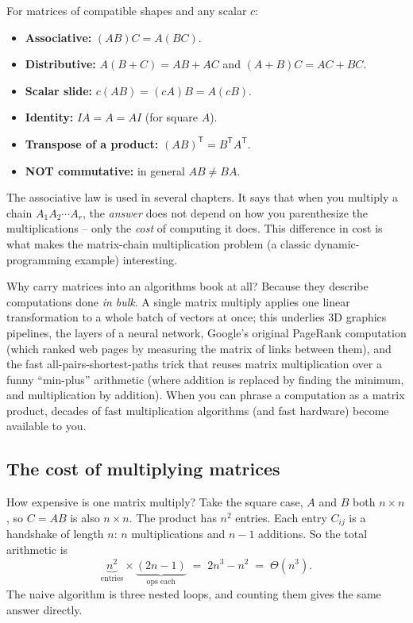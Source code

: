 \begin{formalbox}
For matrices of compatible shapes and any scalar $c$:
\begin{itemize}
  \item \textbf{Associative:} $(AB)C = A(BC)$.
  \item \textbf{Distributive:} $A(B+C) = AB + AC$ and $(A+B)C = AC + BC$.
  \item \textbf{Scalar slide:} $c(AB) = (cA)B = A(cB)$.
  \item \textbf{Identity:} $IA = A = AI$ (for square $A$).
  \item \textbf{Transpose of a product:} $(AB)^{\mathsf T} = B^{\mathsf T}A^{\mathsf T}$.
  \item \textbf{NOT commutative:} in general $AB \ne BA$.
\end{itemize}
\end{formalbox}

The associative law is used in several chapters. It says that when you multiply a chain $A_1 A_2 \cdots A_r$, the
\emph{answer} does not depend on how you parenthesize the multiplications -- only
the \emph{cost} of computing it does. This difference in cost is what makes
the matrix-chain multiplication problem (a classic dynamic-programming example)
interesting.

\begin{aestheticbox}
Why carry matrices into an algorithms book at all? Because they describe
computations done \emph{in bulk}. A single matrix multiply applies one linear
transformation to a whole batch of vectors at once; this underlies 3D
graphics pipelines, the layers of a neural network, Google's original PageRank
computation (which ranked web pages by measuring the matrix of links between them), and the fast all-pairs-shortest-paths trick that reuses matrix
multiplication over a funny ``min-plus'' arithmetic (where addition is replaced by finding the minimum, and multiplication by addition). When you can phrase a
computation as a matrix product, decades of fast multiplication algorithms (and
fast hardware) become available to you.
\end{aestheticbox}

\subsection{The cost of multiplying matrices}
\label{ch39:matmul-cost}

How expensive is one matrix multiply? Take the square case, $A$ and $B$ both
$n \times n$, so $C = AB$ is also $n \times n$. The product has $n^2$ entries.
Each entry $C_{ij}$ is a handshake of length $n$: $n$ multiplications and $n - 1$
additions. So the total arithmetic is
\[
\underbrace{n^2}_{\text{entries}} \times \underbrace{(2n - 1)}_{\text{ops each}}
\;=\; 2n^3 - n^2 \;=\; \Theta(n^3).
\]
The naive algorithm is three nested loops, and counting them gives the same
answer directly.

